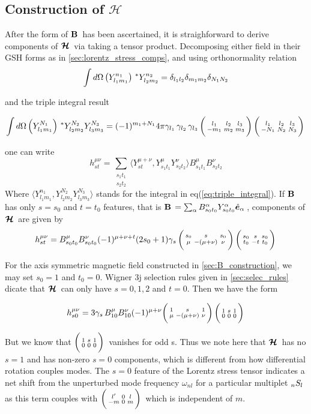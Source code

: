 \subsection{Construction of $\mathcal{H}$}

After the form of $\mathbf{B}\,$ has been ascertained, it is straighforward to derive components of $\bm{\mathcal{H}}\,$ via taking a tensor product. Decomposing either field in their GSH forms as in \ref{sec:lorentz_stress_comps}, and using orthonormality relation
\begin{equation}
\int d\Omega \left( Y_{l_1m_1}^{n_1} \right)\,^*Y_{l_2m_2}^{n_2} = \delta_{l_1l_2}\delta_{m_1m_2}\delta_{N_1N_2}
\end{equation}

and the triple integral result

\begin{equation}\label{eq:triple_integral}
\int d\Omega \left( Y_{l_1m_1}^{N_1} \right)\,^*Y_{l_2m_2}^{N_2}  Y_{l_3m_3}^{N_3}= (-1)^{m_1+N_1}4\pi \gamma_{l_1}\,\gamma_{l_2}\,\gamma_{l_3}\, \bigg(\begin{smallmatrix} l_1 & l_2 & l_3 \\-m_1 & m_2 & m_3 \end{smallmatrix}\bigg)\, \bigg(\begin{smallmatrix} l_1 & l_2 & l_3 \\-N_1 & N_2 & N_3 \end{smallmatrix}\bigg)\,
\end{equation}

one can write
\begin{equation}
h^{\mu\nu}_{st} = \sum_{\substack{s_1t_1\\ s_2t_2}} \langle Y_{st}^{\mu+\nu}, Y_{s_1 t_1}^{\mu}  Y_{s_2 t_2}^{\nu}\rangle B_{s_1t_1}^{\mu} B_{s_2t_2}^{\nu}
\end{equation}
Where $\langle Y_{l_1m_1}^{n_1}, Y_{l_2m_2}^{N_2}  Y_{l_3m_3}^{N_3}\rangle$ stands for the integral in eq(\ref{eq:triple_integral}).
If $\mathbf{B}\,$ has only $s=s_0$ and $t=t_0$ features, that is $\mathbf{B}\, = \sum_{\alpha}B_{s_0t_0}^{\alpha}Y_{s_0t_0}^{\alpha} \hat{\bm{e}}_{\alpha}\,$, components of $\bm{\mathcal{H}}\,$ are given by
\begin{equation}\label{eq:single_feature_B}
h_{st}^{\mu\nu} = B^{\mu}_{s_0 t_0}B^{\nu}_{s_0 t_0} (-1)^{\mu + \nu + t} (2s_0+1) \gamma_{s}\, \bigg(\begin{smallmatrix} s_0 & s & s_0 \\\mu & -(\mu+\nu) & \nu \end{smallmatrix}\bigg)\, \bigg(\begin{smallmatrix} s_0 & s & s_0 \\t_0 & -t & t_0 \end{smallmatrix}\bigg)\,
\end{equation}

For the axis symmetric magnetic field constructed in \ref{sec:B_construction}, we may set $s_0=1$ and $t_0=0$. Wigner 3j selection rules given in \ref{sec:selec_rules} dicate that $\bm{\mathcal{H}}\,$ can only have $s=0,1,2$ and $t=0$. Then we have the form
 	
\begin{equation}
h_{s0}^{\mu\nu} = 3 \gamma_{s}\, B^{\mu}_{10}B^{\nu}_{10} (-1)^{\mu + \nu} \bigg(\begin{smallmatrix} 1 & s & 1 \\\mu & -(\mu+\nu) & \nu \end{smallmatrix}\bigg)\, \bigg(\begin{smallmatrix} 1 & s & 1 \\0 & 0 & 0 \end{smallmatrix}\bigg)\,
\end{equation}

But we know that $\bigg(\begin{smallmatrix} 1 & s & 1 \\0 & 0 & 0 \end{smallmatrix}\bigg)\,$ vanishes for odd s. Thus we note here that $\bm{\mathcal{H}}\,$ has no $s=1$ and has non-zero $s=0$ components, which is different from how differential rotation couples modes. The $s=0$ feature of the Lorentz stress tensor indicates a net shift from the unperturbed mode frequency $\omega_{{nl}}$ for a particular multiplet $_{n}S_{l}\,$ as this term couples with $\bigg(\begin{smallmatrix} l' & 0 & l \\-m & 0 & m \end{smallmatrix}\bigg)\,$ which is independent of $m$.